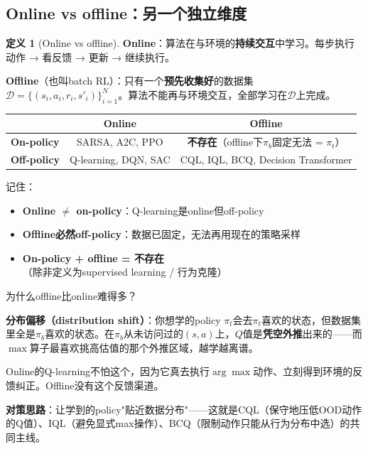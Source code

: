 \documentclass[11pt,a4paper]{article}
\theoremstyle{definition}
\newtheorem{definition}{定义}[section]
\begin{document}
\subsection{Online vs offline：另一个独立维度}

\begin{definition}[Online vs offline]
\textbf{Online}：算法在与环境的\textbf{持续交互}中学习。每步执行动作 → 看反馈 → 更新 → 继续执行。

\textbf{Offline}（也叫batch RL）：只有一个\textbf{预先收集好}的数据集$\mathcal D = \{(s_i, a_i, r_i, s'_i)\}_{i=1}^N$。算法不能再与环境交互，全部学习在$\mathcal D$上完成。
\end{definition}

\begin{keypoint}
\begin{center}
\begin{tabular}{l|c|c}
\toprule
& \textbf{Online} & \textbf{Offline} \\
\midrule
\textbf{On-policy} & SARSA, A2C, PPO & \textbf{不存在}（offline下$\pi_b$固定无法 = $\pi_t$） \\
\textbf{Off-policy} & Q-learning, DQN, SAC & CQL, IQL, BCQ, Decision Transformer \\
\bottomrule
\end{tabular}
\end{center}

记住：
\begin{itemize}
\item \textbf{Online $\neq$ on-policy}：Q-learning是online但off-policy
\item \textbf{Offline必然off-policy}：数据已固定，无法再用现在的策略采样
\item \textbf{On-policy + offline = 不存在}（除非定义为supervised learning / 行为克隆）
\end{itemize}
\end{keypoint}

\begin{plainwords}
为什么offline比online难得多？

\textbf{分布偏移（distribution shift）}：你想学的policy $\pi_t$会去$\pi_t$喜欢的状态，但数据集里全是$\pi_b$喜欢的状态。在$\pi_b$从未访问过的$(s, a)$上，$Q$值是\textbf{凭空外推}出来的——而$\max$算子最喜欢挑高估值的那个外推区域，越学越离谱。

Online的Q-learning不怕这个，因为它真去执行$\arg\max$动作、立刻得到环境的反馈纠正。Offline没有这个反馈渠道。

\textbf{对策思路}：让学到的policy"贴近数据分布"——这就是CQL（保守地压低OOD动作的Q值）、IQL（避免显式max操作）、BCQ（限制动作只能从行为分布中选）的共同主线。
\end{plainwords}
\end{document}
